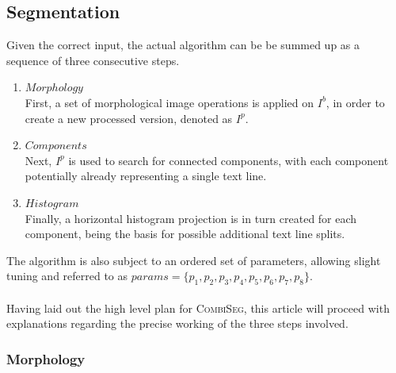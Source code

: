 \documentclass{jdmdh}
\begin{document}
\subsection{Segmentation}

Given the correct input, the actual algorithm can be be summed up as a sequence of three consecutive steps. \\
\begin{enumerate}
    \item $Morphology$ \\
    First, a set of morphological image operations is applied on $I^b$, in order to create a new processed version, denoted as $I^p$. \\
    \item $Components$ \\
    Next, $I^p$ is used to search for connected components, with each component potentially already representing a single text line. \\
    \item $Histogram$ \\
    Finally, a horizontal histogram projection is in turn created for each component, being the basis for possible additional text line splits. \\
\end{enumerate}
The algorithm is also subject to an ordered set of parameters, allowing slight tuning and referred to as $params\!=\!\{p_1, p_2, p_3, p_4, p_5, p_6, p_7, p_8\}$. \\ \\
Having laid out the high level plan for \mbox{\textsc{CombiSeg}}, this article will proceed with explanations regarding the precise working of the three steps involved.
\subsubsection{Morphology}
\end{document}

